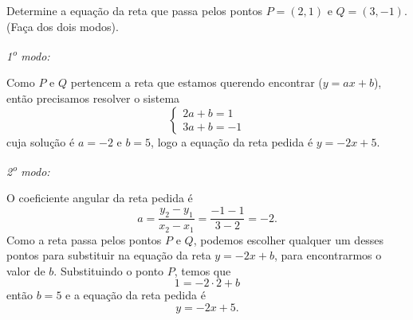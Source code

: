 \begin{example}
  Determine a equação da reta que passa pelos pontos $P=(2,1)$ e $Q=(3,-1)$.
  (Faça dos dois modos).

  \solution
  \emph{1\textsuperscript{o} modo:}

  Como $P$ e $Q$ pertencem a reta que estamos
  querendo encontrar ($y=ax+b$), então precisamos resolver o sistema
  \[
    \begin{cases}
      2a+b=1 \\
      3a+b=-1
    \end{cases}
  \]
  cuja solução é $a=-2$ e $b=5$, logo a equação da reta pedida é $y=-2x+5$.

  \emph{2\textsuperscript{o} modo:}

  O coeficiente angular da reta pedida é
  \[
    a
    = \frac{y_2-y_1}{x_2-x_1}
    = \frac{-1-1}{3-2}=-2.
  \]
  Como a reta passa pelos pontos $P$ e $Q$, podemos escolher qualquer um desses
  pontos para substituir na equação da reta $y=-2x+b$, para encontrarmos o valor
  de $b$. Substituindo o ponto $P$, temos que
  \[
    1 = -2 \cdot 2+b
  \]
  então $b=5$ e a equação da reta pedida é
  \[
    y=-2x+5.
  \]
\end{example}

